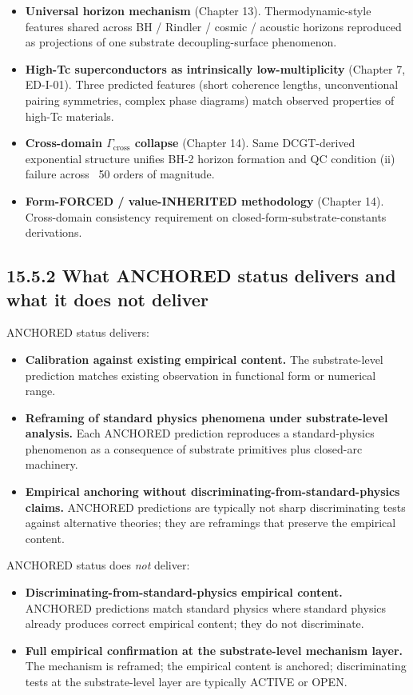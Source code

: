 \documentclass[11pt]{book}
\begin{document}
\begin{itemize}
\item \textbf{Universal horizon mechanism} (Chapter 13). Thermodynamic-style features shared across BH / Rindler / cosmic / acoustic horizons reproduced as projections of one substrate decoupling-surface phenomenon.
\item \textbf{High-Tc superconductors as intrinsically low-multiplicity} (Chapter 7, ED-I-01). Three predicted features (short coherence lengths, unconventional pairing symmetries, complex phase diagrams) match observed properties of high-Tc materials.
\item \textbf{Cross-domain $\Gamma_\mathrm{cross}$ collapse} (Chapter 14). Same DCGT-derived exponential structure unifies BH-2 horizon formation and QC condition (ii) failure across ~50 orders of magnitude.
\item \textbf{Form-FORCED / value-INHERITED methodology} (Chapter 14). Cross-domain consistency requirement on closed-form-substrate-constants derivations.
\end{itemize}

\subsection{15.5.2 What ANCHORED status delivers and what it does not deliver}

ANCHORED status delivers:
\begin{itemize}
\item \textbf{Calibration against existing empirical content.} The substrate-level prediction matches existing observation in functional form or numerical range.
\item \textbf{Reframing of standard physics phenomena under substrate-level analysis.} Each ANCHORED prediction reproduces a standard-physics phenomenon as a consequence of substrate primitives plus closed-arc machinery.
\item \textbf{Empirical anchoring without discriminating-from-standard-physics claims.} ANCHORED predictions are typically not sharp discriminating tests against alternative theories; they are reframings that preserve the empirical content.
\end{itemize}

ANCHORED status does \textit{not} deliver:
\begin{itemize}
\item \textbf{Discriminating-from-standard-physics empirical content.} ANCHORED predictions match standard physics where standard physics already produces correct empirical content; they do not discriminate.
\item \textbf{Full empirical confirmation at the substrate-level mechanism layer.} The mechanism is reframed; the empirical content is anchored; discriminating tests at the substrate-level layer are typically ACTIVE or OPEN.
\end{itemize}
\end{document}
